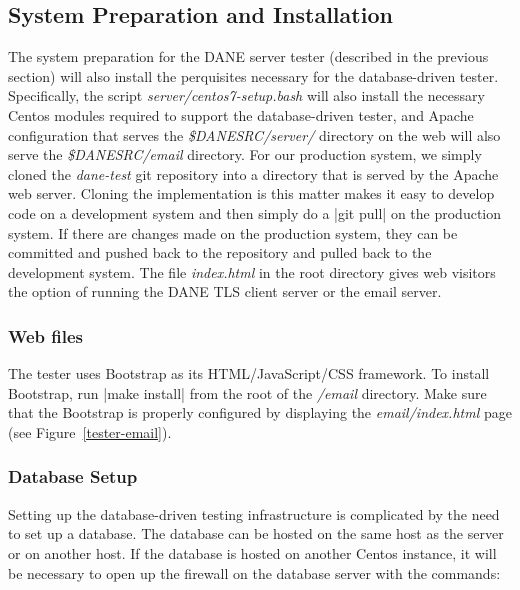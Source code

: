 \documentclass[preprint,3p,11pt]{elsarticle}
\begin{document}
\subsection{System Preparation and Installation}
The system preparation for the DANE server tester (described in the
previous section) will also
install the perquisites necessary for the database-driven
tester. Specifically, the script \emph{server/centos7-setup.bash} will also
install the necessary 
Centos modules required to support the database-driven tester, and
Apache configuration that serves the \emph{\$DANESRC/server/} directory on
the web will also serve the \emph{\$DANESRC/email} directory. For our
production system, we simply cloned the \emph{dane-test} git repository
into a directory that is served by the Apache web server. Cloning the
implementation is this matter makes it easy to develop code on a
development system and then simply do a |git pull| on the production
system. If there are changes made on the production system, they can
be committed and pushed back to the repository and pulled back to the
development system. The file
\emph{index.html} in the root directory gives web visitors the option of
running the DANE TLS client server or the email server. 

\subsubsection{Web files}

The tester uses Bootstrap as its HTML/JavaScript/CSS framework. To
install Bootstrap, run |make install| from the root of the \emph{/email} directory. Make
sure that the Bootstrap is properly configured by displaying the
\emph{email/index.html} page (see Figure~\ref{tester-email}).




\subsubsection{Database Setup}

Setting up the database-driven testing infrastructure is complicated
by the need to set up a database. The database can be hosted on the
same host as the server or on another host. If the database is hosted
on another Centos instance, it will be necessary to open up the
firewall on the database server with the commands:
\end{document}
